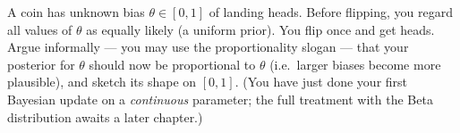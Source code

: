 \begin{exercise}
A coin has unknown bias $\theta\in[0,1]$ of landing heads. Before flipping, you regard all
values of $\theta$ as equally likely (a uniform prior). You flip once and get heads.
Argue informally --- you may use the proportionality slogan --- that your posterior for
$\theta$ should now be proportional to $\theta$ (i.e.\ larger biases become more
plausible), and sketch its shape on $[0,1]$. (You have just done your first Bayesian
update on a \emph{continuous} parameter; the full treatment with the Beta distribution
awaits a later chapter.)
\end{exercise}
